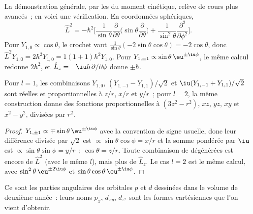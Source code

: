 La démonstration générale, par les  du moment
cinétique, relève de cours plus avancés~; en voici une vérification. En
coordonnées sphériques,
\[
\hat L^2 = -\hbar^2\Big[\frac{1}{\sin\theta}\frac{\partial}{\partial\theta}
\Big(\sin\theta\frac{\partial}{\partial\theta}\Big) +
\frac{1}{\sin^2\theta}\frac{\partial^2}{\partial\phi^2}\Big].
\]
Pour $Y_{1,0} \propto \cos\theta$, le crochet vaut $\frac{1}{\sin\theta}(-2\sin\theta
\cos\theta) = -2\cos\theta$, donc $\hat L^2Y_{1,0} = 2\hbar^2Y_{1,0} = 1(1+1)\hbar^2
Y_{1,0}$. Pour $Y_{1,\pm1} \propto \sin\theta\,\eu^{\pm\iu\phi}$, le même
calcul redonne $2\hbar^2$, et $\hat L_z = -\iu\hbar\,\partial/\partial
\phi$ donne $\pm\hbar$.

\begin{proposition}\label{prop:b3:quantum-model-systems:real-harmonics}
Pour $l = 1$, les combinaisons $Y_{1,0}$, $(Y_{1,-1} - Y_{1,1})/\sqrt2$ et
$\iu(Y_{1,-1} + Y_{1,1})/\sqrt2$ sont réelles et proportionnelles à $z/r$,
$x/r$ et $y/r$~; pour $l = 2$, la même construction donne des fonctions
proportionnelles à $(3z^2 - r^2)$, $xz$, $yz$, $xy$ et $x^2 - y^2$,
divisées par $r^2$.
\end{proposition}

\begin{proof}
$Y_{1,\pm1} \propto \mp\sin\theta\,\eu^{\pm\iu\phi}$ avec la convention de
signe usuelle, donc leur différence divisée par $\sqrt2$ est $\propto\sin\theta\cos\phi =
x/r$ et la somme pondérée par $\iu$ est $\propto\sin\theta\sin\phi = y/r$~;
$\cos\theta = z/r$. Toute combinaison de  dégénérées est
encore  de $\hat L^2$ (avec le même $l$), mais plus de $\hat
L_z$. Le cas $l = 2$ est le même calcul, avec $\sin^2\theta\,\eu^{\pm2\iu\phi}$
et $\sin\theta\cos\theta\,\eu^{\pm\iu\phi}$.
\end{proof}

Ce sont les parties angulaires des orbitales $p$ et $d$ dessinées dans le
volume de deuxième année~: leurs noms $p_x$, $d_{xy}$, $d_{z^2}$ sont les
formes cartésiennes que l'on vient d'obtenir.

